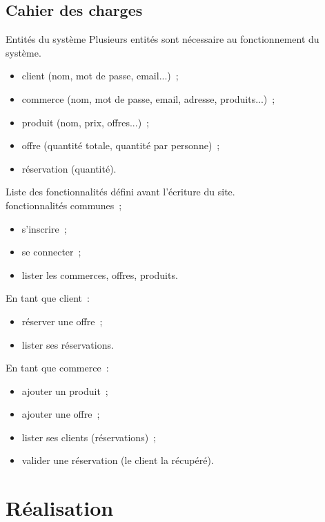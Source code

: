 \documentclass{beamer}
\begin{document}
\subsection{Cahier des charges}

\begin{frame}{Entités du système}
	Plusieurs entités sont nécessaire au fonctionnement du système.
	\begin{itemize}
		\item client (nom, mot de passe, email...)~;
		\item commerce (nom, mot de passe, email, adresse, produits...)~;
		\item produit (nom, prix, offres...)~;
		\item offre (quantité totale, quantité par personne)~;
		\item réservation (quantité).
	\end{itemize}

\end{frame}


\begin{frame}
	Liste des fonctionnalités défini avant l'écriture du site. \\
	fonctionnalités communes~;
	\begin{itemize}
		\item s'inscrire~;
		\item se connecter~;
		\item lister les commerces, offres, produits.
	\end{itemize}

	En tant que client~:
	\begin{itemize}
		\item réserver une offre~;
		\item lister ses réservations.
	\end{itemize}
	
	En tant que commerce~:
	\begin{itemize}
		\item ajouter un produit~;
		\item ajouter une offre~;
		\item lister ses clients (réservations)~;
		\item valider une réservation (le client la récupéré).
	\end{itemize}
\end{frame}

\section{Réalisation}
\end{document}
